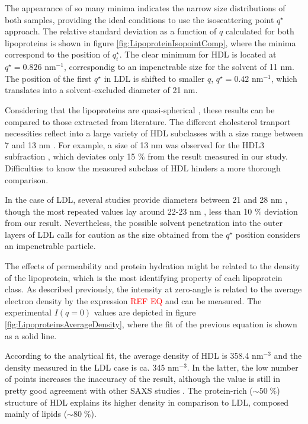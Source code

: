 The appearance of so many minima indicates the narrow size distributions of both samples, providing the ideal conditions to use the isoscattering point $q^{\star}$ approach. The relative standard deviation as a function of $q$ calculated for both lipoproteins is shown in figure \ref{fig:LipoproteinIsopointComp}, where the minima correspond to the position of $q^{\star}_i$. The clear minimum for HDL is located at $q^{\star}=0.826$ nm$^{-1}$, correspondig to an impenetrable size for the solvent of 11 nm. The position of the first $q^{\star}$ in LDL is shifted to smaller $q$, $q^{\star}=0.42$ nm$^{-1}$, which translates into a solvent-excluded diameter of 21 nm.

Considering that the lipoproteins are quasi-spherical \cite{stuhrmann_neutron_1975}, these results can be compared to those extracted from literature. The different cholesterol tranport necessities reflect into a large variety of HDL subclasses with a size range between 7 and 13 nm \cite{german_lipoproteins:_2006}. For example, a size of 13 nm was observed for the HDL3 subfraction \cite{tardieu_structure_1976}, which deviates only 15 $\%$ from the result measured in our study. Difficulties to know the measured subclass of HDL hinders a more thorough comparison.

In the case of LDL, several studies provide diameters between 21 and 28 nm \cite{tardieu_structure_1976,colhoun_lipoprotein_2002,german_lipoproteins:_2006}, though the most repeated values lay around 22-23 nm \cite{muller_structure_1978,luzzati_structure_1979}, less than 10 $\%$ deviation from our result. Nevertheless, the possible solvent penetration into the outer layers of LDL \cite{stuhrmann_neutron_1975,tardieu_structure_1976} calls for caution as the size obtained from the $q^{\star}$ position considers an impenetrable particle.

The effects of permeability and protein hydration might be related to the density of the lipoprotein, which is the most identifying property of each lipoprotein class. As described previously, the intensity at zero-angle is related to the average electron density by the expression \textcolor{red}{REF EQ} and can be measured. The experimental $I(q=0)$ values are depicted in figure \ref{fig:LipoproteinsAverageDensity}, where the fit of the previous equation is shown as a solid line. 

According to the analytical fit, the average density of HDL is 358.4 nm$^{-3}$ and the density measured in the LDL case is ca. 345 nm$^{-3}$. In the latter, the low number of points increases the inaccuracy of the result, although the value is still in pretty good agreement with other SAXS studies \cite{tardieu_structure_1976,luzzati_structure_1979}. The protein-rich ($\sim 50 \; \% $) structure of HDL explains its higher density in comparison to LDL, composed mainly of lipids ($\sim 80 \; \% $). 

